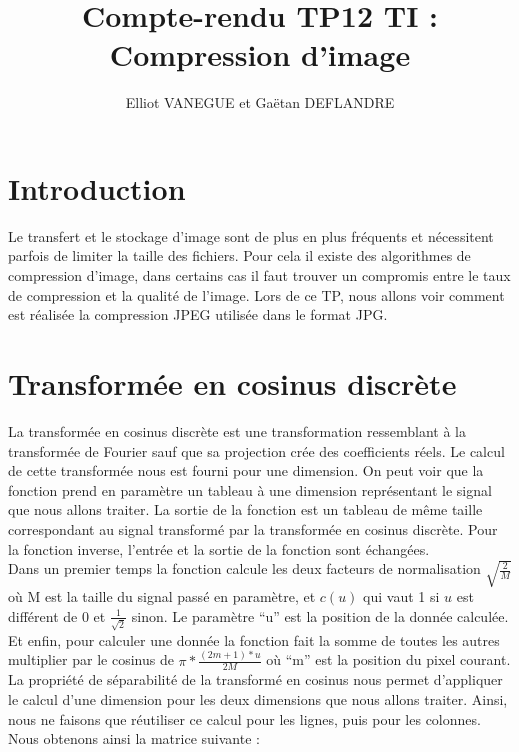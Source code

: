 \documentclass[a4paper,11pt]{article}
\title{Compte-rendu TP12 TI : Compression d'image}
\author{Elliot VANEGUE et Gaëtan DEFLANDRE}
\begin{document}


  \maketitle
  
  \mbox{}
  \newpage
  \clearpage
  
  \section{Introduction}
  Le transfert et le stockage d'image sont de plus en plus fréquents et nécessitent parfois de limiter la taille
  des fichiers. Pour cela il existe des algorithmes de compression d'image, dans certains cas il faut trouver 
  un compromis entre le taux de compression et la qualité de l'image. Lors de ce TP, nous allons voir comment 
  est réalisée la compression JPEG utilisée dans le format JPG.
  
  \section{Transformée en cosinus discrète}
  La transformée en cosinus discrète est une transformation ressemblant à la transformée de Fourier sauf
  que sa projection crée des coefficients réels. Le calcul de cette transformée nous est fourni pour une dimension.
  On peut voir que la fonction prend en paramètre un tableau à une dimension représentant le signal que nous allons traiter.
  La sortie de la fonction est un tableau de même taille correspondant au signal transformé par la transformée
  en cosinus discrète. Pour la fonction inverse, l'entrée et la sortie de la fonction sont échangées.\\
  
  Dans un premier temps la fonction calcule les deux facteurs de normalisation $\sqrt{\frac{2}{M}}$ où M est
  la taille du signal passé en paramètre, et $c(u)$ qui vaut 1 si $u$ est différent de 0 et $\frac{1}{\sqrt{2}}$ sinon.
  Le paramètre \enquote{u} est la position de la donnée calculée. 
  Et enfin, pour calculer une donnée la fonction
  fait la somme de toutes les autres multiplier par le cosinus de $\pi * \frac{(2m+1)*u}{2M}$ où \enquote{m}
  est la position du pixel courant.\\
  
  La propriété de séparabilité de la transformé en cosinus nous permet d'appliquer le calcul d'une dimension
  pour les deux dimensions que nous allons traiter. Ainsi, nous ne faisons que réutiliser ce calcul pour les lignes, puis pour les
  colonnes. Nous obtenons ainsi la matrice suivante :
  
\end{document}
